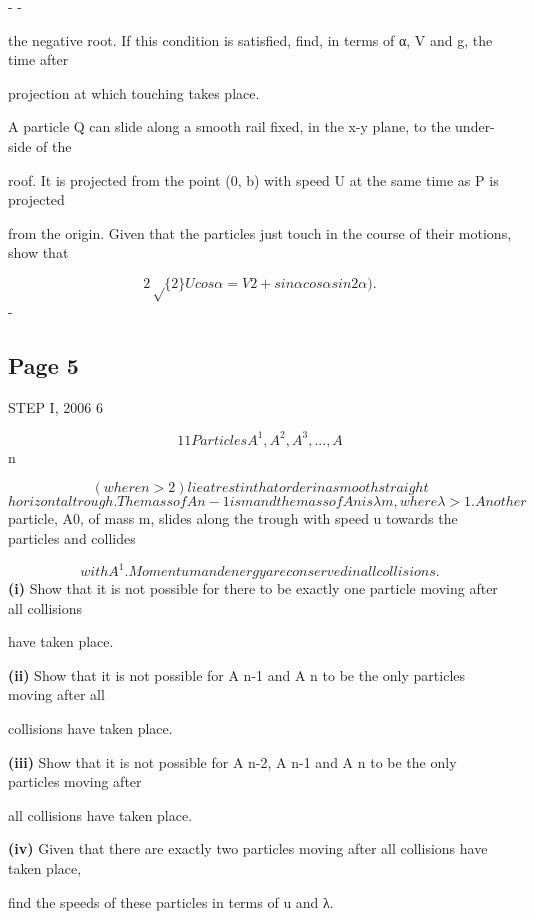 \documentclass[12pt]{article}
\begin{document}
\begin{flushleft}
- -\par
the negative root. If this condition is satisfied, find, in terms of α, V and g, the time after\par
projection at which touching takes place.\par
A particle Q can slide along a smooth rail fixed, in the x-y plane, to the under-side of the\par
roof. It is projected from the point (0, b) with speed U at the same time as P is projected\par
from the origin. Given that the particles just touch in the course of their motions, show that\par
\[2\sqrt\{2\} U cos α = V 2 + sin α cos α sin 2 α).\]
-\par
\end{flushleft}
\subsection*{Page 5}
\begin{flushleft}
STEP I, 2006 6\par
\[11 Particles A^1, A^2, A^3, . . ., A\]
n\par
\[(where n > 2) lie at rest in that order in a smooth straight\]
\[horizontal trough. The mass of A n-1 is m and the mass of A n is λm, where λ > 1. Another\]
particle, A0, of mass m, slides along the trough with speed u towards the particles and collides\par
\[with A^1. Momentum and energy are conserved in all collisions.\]
\textbf{(i)} Show that it is not possible for there to be exactly one particle moving after all collisions\par
have taken place.\par
\textbf{(ii)} Show that it is not possible for A n-1 and A n to be the only particles moving after all\par
collisions have taken place.\par
\textbf{(iii)} Show that it is not possible for A n-2, A n-1 and A n to be the only particles moving after\par
all collisions have taken place.\par
\textbf{(iv)} Given that there are exactly two particles moving after all collisions have taken place,\par
find the speeds of these particles in terms of u and λ.\par
\end{flushleft}
\end{document}
